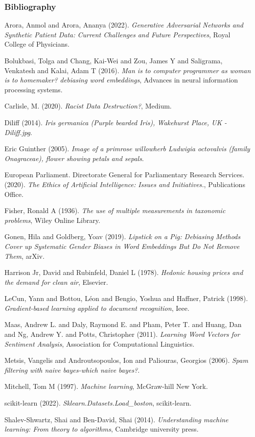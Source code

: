 \documentclass[10pt]{beamer}
\begin{document}
\subsubsection*{Bibliography}
\label{sec:org3f4684e}
\noindent
Arora, Anmol and Arora, Ananya (2022). \emph{Generative Adversarial Networks and Synthetic Patient Data: Current Challenges and Future Perspectives}, {Royal College of Physicians}.

\noindent
Bolukbasi, Tolga and Chang, Kai-Wei and Zou, James Y and Saligrama, Venkatesh and Kalai, Adam T (2016). \emph{Man is to computer programmer as woman is to homemaker? debiasing word embeddings}, Advances in neural information processing systems.

\noindent
Carlisle, M. (2020). \emph{Racist Data Destruction?}, Medium.

\noindent
Diliff (2014). \emph{Iris germanica (Purple bearded Iris), Wakehurst Place, UK - Diliff.jpg}.

\noindent
Eric Guinther (2005). \emph{Image of a primrose willowherb Ludwigia octovalvis (family Onagraceae), flower showing petals and sepals}.

\noindent
{European Parliament. Directorate General for Parliamentary Research Services.} (2020). \emph{The Ethics of Artificial Intelligence: Issues and Initiatives.}, {Publications Office}.

\noindent
Fisher, Ronald A (1936). \emph{The use of multiple measurements in taxonomic problems}, Wiley Online Library.

\noindent
Gonen, Hila and Goldberg, Yoav (2019). \emph{Lipstick on a {{Pig}}: {{Debiasing Methods Cover}} up {{Systematic Gender Biases}} in {{Word Embeddings But}} Do Not {{Remove Them}}}, {arXiv}.

\noindent
Harrison Jr, David and Rubinfeld, Daniel L (1978). \emph{Hedonic housing prices and the demand for clean air}, Elsevier.

\noindent
LeCun, Yann and Bottou, L{\'e}on and Bengio, Yoshua and Haffner, Patrick (1998). \emph{Gradient-based learning applied to document recognition}, Ieee.

\noindent
Maas, Andrew L. and Daly, Raymond E. and Pham, Peter T. and Huang, Dan and Ng, Andrew Y. and Potts, Christopher (2011). \emph{Learning Word Vectors for Sentiment Analysis}, Association for Computational Linguistics.

\noindent
Metsis, Vangelis and Androutsopoulos, Ion and Paliouras, Georgios (2006). \emph{Spam filtering with naive bayes-which naive bayes?}.

\noindent
Mitchell, Tom M (1997). \emph{Machine learning}, McGraw-hill New York.

\noindent
scikit-learn (2022). \emph{Sklearn.Datasets.Load\_boston}, scikit-learn.

\noindent
Shalev-Shwartz, Shai and Ben-David, Shai (2014). \emph{Understanding machine learning: From theory to algorithms}, Cambridge university press.
\end{document}
